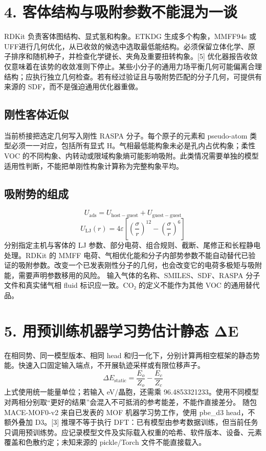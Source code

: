 \documentclass[UTF8,a4paper,11pt]{ctexart}
\begin{document}
\section*{4. 客体结构与吸附参数不能混为一谈}
RDKit 负责客体图结构、显式氢和构象。ETKDG 生成多个构象，MMFF94s 或 UFF进行几何优化，从已收敛的候选中选取最低能结构。必须保留立体化学、原子排序和随机种子，并检查化学键长、夹角及重要扭转构象。[5]
优化器报告收敛仅意味着在该势的收敛准则下停止。某些小分子的通用力场平衡几何可能偏离合理结构；应执行独立几何检查。若有经过验证且与吸附势匹配的分子几何，可提供有来源的 SDF，而不是强迫通用优化器重做。
\subsection*{刚性客体近似}
当前桥接把选定几何写入刚性 RASPA 分子。每个原子的元素和 pseudo-atom 类型必须一一对应，包括所有显式 H。气相最低能构象未必是孔内占优构象；柔性VOC 的不同构象、内转动或限域构象熵可能影响吸附。此类情况需要单独的模型适用性判断，不能把单刚性构象计算称为完整构象平均。
\subsection*{吸附势的组成}
\begin{equation*}
U_{\mathrm{ads}}=U_{\mathrm{host-guest}}+U_{\mathrm{guest-guest}}
\end{equation*}
\begin{equation*}
U_{\mathrm{LJ}}(r)=4\varepsilon\left[\left(\frac{\sigma}{r}\right)^{12}-\left(\frac{\sigma}{r}\right)^6\right]
\end{equation*}
分别指定主机与客体的 LJ 参数、部分电荷、组合规则、截断、尾修正和长程静电处理。RDKit 的 MMFF 电荷、气相优化能和分子内部势参数不能自动替代已验证的吸附参数。改变一个已发表刚性分子的几何，也会改变它的电荷多极矩与吸附能，需要声明参数移用的风险。
输入气体的名称、SMILES、SDF、RASPA 分子文件和真实储气相 fluid 标识应一致。CO₂ 的定义不能作为其他 VOC 的通用替代品。
\clearpage
\section*{5. 用预训练机器学习势估计静态 ΔE}
在相同势、同一模型版本、相同 head 和归一化下，分别计算两相空框架的静态势能。快速入口固定输入端点，不开展轨迹采样或有限位移声子。
\begin{equation*}
\Delta E_{\mathrm{static}}=\frac{E_o}{Z_o}-\frac{E_c}{Z_c}
\end{equation*}
上式使用统一能量单位；若输入 eV/晶胞，还需乘 96.4853321233。使用不同模型对两相分别取“更好的结果”会混入不可抵消的参考能差，不能作直接差分。
随包 MACE-MOF0-v2 来自已发表的 MOF 机器学习势工作，使用 pbe\_d3 head，不额外叠加 D3。[3] 推理不等于执行 DFT：已有模型由参考数据训练，但当前任务只调用预训练势。应记录模型文件及实际载入权重的哈希、软件版本、设备、元素覆盖和色散约定；未知来源的 pickle/Torch 文件不能直接载入。
\end{document}

